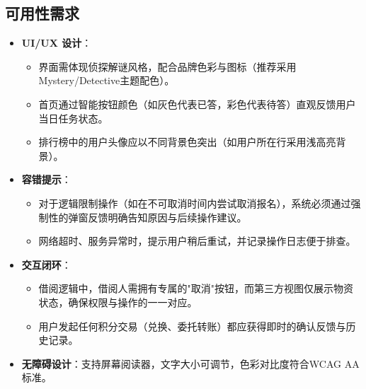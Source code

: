 \documentclass[a4paper,12pt]{article}
\begin{document}
\subsection{可用性需求}
\begin{itemize}
    \item \textbf{UI/UX 设计}：
        \begin{itemize}
            \item 界面需体现侦探解谜风格，配合品牌色彩与图标（推荐采用Mystery/Detective主题配色）。
            \item 首页通过智能按钮颜色（如灰色代表已答，彩色代表待答）直观反馈用户当日任务状态。
            \item 排行榜中的用户头像应以不同背景色突出（如用户所在行采用浅高亮背景）。
        \end{itemize}
    \item \textbf{容错提示}：
        \begin{itemize}
            \item 对于逻辑限制操作（如在不可取消时间内尝试取消报名），系统必须通过强制性的弹窗反馈明确告知原因与后续操作建议。
            \item 网络超时、服务异常时，提示用户稍后重试，并记录操作日志便于排查。
        \end{itemize}
    \item \textbf{交互闭环}：
        \begin{itemize}
            \item 借阅逻辑中，借阅人需拥有专属的"取消"按钮，而第三方视图仅展示物资状态，确保权限与操作的一一对应。
            \item 用户发起任何积分交易（兑换、委托转账）都应获得即时的确认反馈与历史记录。
        \end{itemize}
    \item \textbf{无障碍设计}：支持屏幕阅读器，文字大小可调节，色彩对比度符合WCAG AA标准。
\end{itemize}
\end{document}
